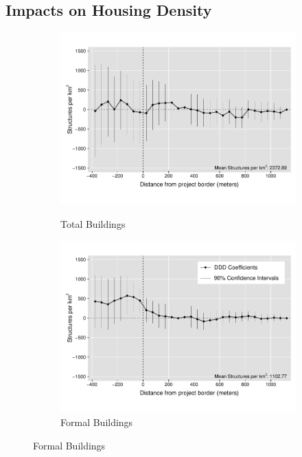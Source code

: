 \documentclass[12pt]{article}
\begin{document}
\subsection{Impacts on Housing Density}

\begin{figure}[t!]
        \centering
        \begin{subfigure}[b]{0.49\textwidth}
            \centering
            \caption[]{Total Buildings}  
            \vspace{-2mm}
            \includegraphics[width=\textwidth,trim={0cm .8cm 0cm .6cm}, clip=true]{figures/distplotDDD_bblu_total_buildings_admin}
            \label{fig:DDDtotal}
        \end{subfigure}
        \hfill
        \begin{subfigure}[b]{0.49\textwidth}  
            \centering 
            \caption[]{Formal Buildings}
            \vspace{-2mm}
            \includegraphics[width=\textwidth,trim={0cm .8cm 0cm .6cm}, clip=true]{figures/distplotDDD_bblu_for_admin}     

\end{subfigure}
\end{figure}
\end{document}
